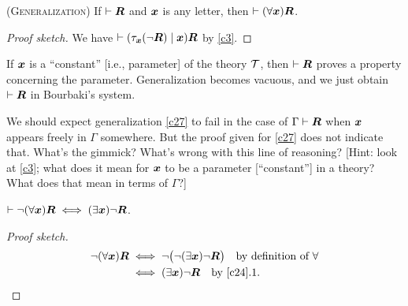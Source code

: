 \begin{dc}\label{c27}\textup{(\textsc{Generalization})}\enspace\ignorespaces%
If $\vdash\boldsymbol{R}$ and $\boldsymbol{x}$ is any letter, then
$\vdash(\forall\boldsymbol{x})\boldsymbol{R}$.
\end{dc}

\begin{proof}[Proof sketch]
We have $\vdash(\tau_{\boldsymbol{x}}(\neg\boldsymbol{R})\mid\boldsymbol{x})\boldsymbol{R}$
by \ref{c3}.
\end{proof}

\begin{remark*}
If $\boldsymbol{x}$ is a ``constant'' [i.e., parameter] of the theory
$\mathcal{T}$, then $\vdash\boldsymbol{R}$ proves a property concerning
the parameter. Generalization becomes vacuous, and we just obtain
$\vdash\boldsymbol{R}$ in Bourbaki's system.
\end{remark*}

\begin{puzzle}
We should expect generalization \ref{c27} to fail in the case of
$\Gamma\vdash\boldsymbol{R}$ when $\boldsymbol{x}$ appears freely in
$\Gamma$ somewhere. But the proof given for \ref{c27} does not indicate
that. What's the gimmick? What's wrong with this line of reasoning?
[Hint: look at \ref{c3}; what does it mean for $\boldsymbol{x}$ to be
  a parameter [``constant''] in a theory? What does that mean in terms
  of $\Gamma$?]
\end{puzzle}

\begin{dc}\label{c28}%
$\vdash\neg(\forall\boldsymbol{x})\boldsymbol{R}\iff(\exists\boldsymbol{x})\neg\boldsymbol{R}$.
\end{dc}

\begin{proof}[Proof sketch]
\begin{align*}
\neg(\forall\boldsymbol{x})\boldsymbol{R} &\iff\neg\bigl(\neg(\exists\boldsymbol{x})\neg\boldsymbol{R}\bigr)\quad\mbox{by definition of $\forall$}\\
&\iff(\exists\boldsymbol{x})\neg\boldsymbol{R}\quad\mbox{by \ref{c24}.1}.\qedhere
\end{align*}
\end{proof}
